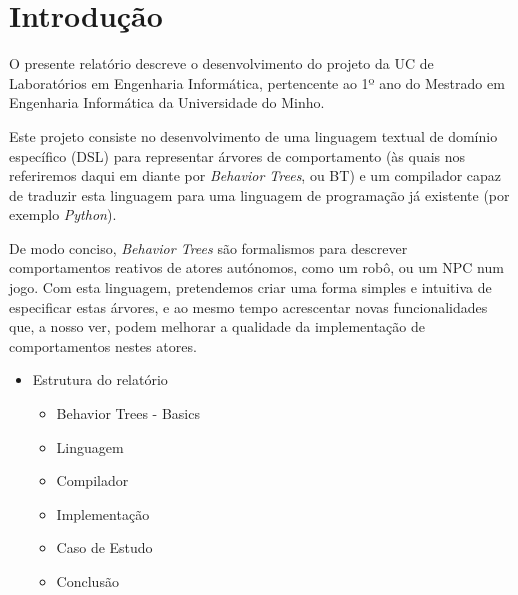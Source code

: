 
\chapter{Introdução} %

\label{Chapter1} %


\newcommand{\keyword}[1]{\textbf{#1}}
\newcommand{\tabhead}[1]{\textbf{#1}}
\newcommand{\code}[1]{\texttt{#1}}
\newcommand{\file}[1]{\texttt{\bfseries#1}}
\newcommand{\option}[1]{\texttt{\itshape#1}}


O presente relatório descreve o desenvolvimento do projeto da UC de Laboratórios em Engenharia Informática, pertencente ao 1º ano do Mestrado em Engenharia Informática da Universidade do Minho.

Este projeto consiste no desenvolvimento de uma linguagem textual de domínio específico (DSL) para representar árvores de comportamento (às quais nos referiremos daqui em diante por \textit{Behavior Trees}, ou BT) e um compilador capaz de traduzir esta linguagem para uma linguagem de programação já existente (por exemplo \textit{Python}).

De modo conciso, \textit{Behavior Trees} são formalismos para descrever comportamentos reativos de atores autónomos, como um robô, ou um NPC num jogo.
Com esta linguagem, pretendemos criar uma forma simples e intuitiva de especificar estas árvores, e ao mesmo tempo acrescentar novas funcionalidades que, a nosso ver, podem melhorar a qualidade da implementação de comportamentos nestes atores.


\begin{itemize}
    \item Estrutura do relatório
    \begin{itemize}
        \item Behavior Trees - Basics
        \item Linguagem
        \item Compilador
        \item Implementação
        \item Caso de Estudo
        \item Conclusão
    \end{itemize}
\end{itemize}

